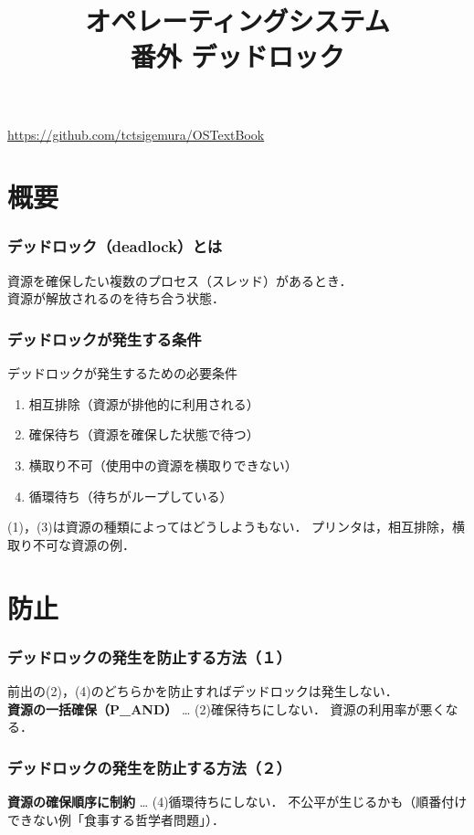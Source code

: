 \documentclass[unicode,handout]{beamer}                   %
\begin{document}
\title[デッドロック]
      {オペレーティングシステム\\番外 デッドロック}
\date{}
\begin{frame}
  \titlepage
  \centerline{\url{https://github.com/tctsigemura/OSTextBook}}
\end{frame}


\section{概要}
\begin{frame}
  \frametitle{デッドロック（deadlock）とは}
  資源を確保したい複数のプロセス（スレッド）があるとき． \\
  資源が解放されるのを待ち合う状態．
  \vfill
  \vfill
\end{frame}

\begin{frame}
  \frametitle{デッドロックが発生する条件}
  デッドロックが発生するための必要条件
  \begin{enumerate}
    \item[(1)] 相互排除（資源が排他的に利用される）
    \item[(2)] 確保待ち（資源を確保した状態で待つ）
    \item[(3)] 横取り不可（使用中の資源を横取りできない）
    \item[(4)] 循環待ち（待ちがループしている）
  \end{enumerate}
  (1)，(3)は資源の種類によってはどうしようもない．
  \vfill
  プリンタは，相互排除，横取り不可な資源の例．
  \vfill
  \vfill
\end{frame}

\section{防止}
\begin{frame}
  \frametitle{デッドロックの発生を防止する方法（１）}
  前出の(2)，(4)のどちらかを防止すればデッドロックは発生しない．\\
  \textbf{資源の一括確保（P\_AND）}  … (2)確保待ちにしない．
  \vfill
  \vfill
  資源の利用率が悪くなる．
\end{frame}

\begin{frame}
  \frametitle{デッドロックの発生を防止する方法（２）}
  \textbf{資源の確保順序に制約}  … (4)循環待ちにしない．
  \vfill
  \vfill
  不公平が生じるかも（順番付けできない例「食事する哲学者問題」）．
\end{frame}
\end{document}
